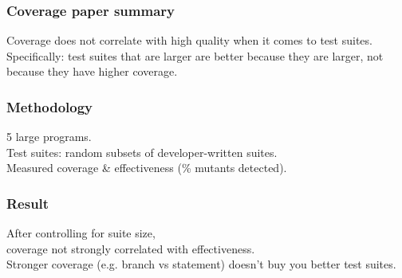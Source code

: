 \documentclass{beamer}
\newenvironment{changemargin}[1]{%
  \begin{list}{}{%
    \setlength{\topsep}{0pt}%
    \setlength{\leftmargin}{#1}%
    \setlength{\rightmargin}{1em}
    \setlength{\listparindent}{\parindent}%
    \setlength{\itemindent}{\parindent}%
    \setlength{\parsep}{\parskip}%
  }%
  \item[]}{\end{list}}
\begin{document}
\begin{frame}
  \frametitle{Coverage paper summary}

  \large
  \begin{changemargin}{2em}
Coverage does not correlate with high quality
when it comes to test suites.\\[1em]

Specifically: test suites that are larger are better because
they are larger, not because they have higher coverage.
  \end{changemargin}
\end{frame}

\begin{frame}
  \frametitle{Methodology}

  \large
  \begin{changemargin}{2em}
    5 large programs.\\
    Test suites: random subsets of developer-written suites.\\[1em]
    Measured coverage \& effectiveness (\% mutants detected).
  \end{changemargin}

\end{frame}

\begin{frame}
  \frametitle{Result}

  \large
  \begin{changemargin}{2em}
    After controlling for suite size, \\
    \hspace*{2em} coverage not strongly correlated with effectiveness.\\[1em]
    Stronger coverage (e.g. branch vs statement) doesn't buy you better test suites.
  \end{changemargin}

\end{frame}

  
\end{document}

